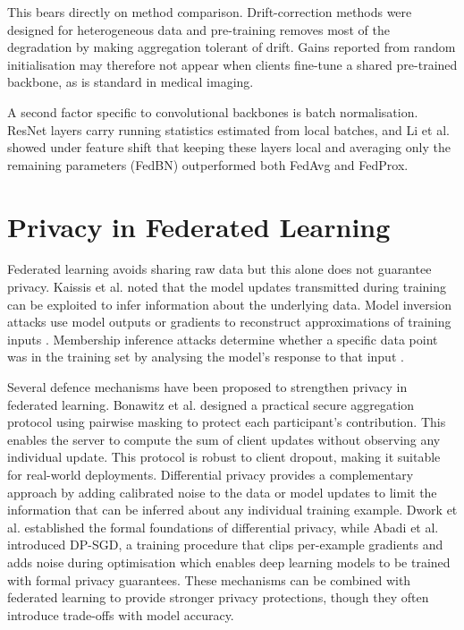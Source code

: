\documentclass[12pt,openany,a4paper]{book}
\begin{document}
This bears directly on method comparison. Drift-correction methods were designed for heterogeneous data and pre-training removes most of the degradation by making aggregation tolerant of drift. Gains reported from random initialisation may therefore not appear when clients fine-tune a shared pre-trained backbone, as is standard in medical imaging.

A second factor specific to convolutional backbones is batch normalisation. ResNet layers carry running statistics estimated from local batches, and Li et al. \cite{liFedBNFederatedLearning2021} showed under feature shift that keeping these layers local and averaging only the remaining parameters (FedBN) outperformed both FedAvg and FedProx.

\section{Privacy in Federated Learning}
Federated learning avoids sharing raw data but this alone does not guarantee privacy. Kaissis et al. \cite{kaissisSecurePrivacypreservingFederated2020} noted that the model updates transmitted during training can be exploited to infer information about the underlying data. Model inversion attacks use model outputs or gradients to reconstruct approximations of training inputs \cite{fredriksonModelInversionAttacks2015}. Membership inference attacks determine whether a specific data point was in the training set by analysing the model's response to that input \cite{shokriMembershipInferenceAttacks2017}.

Several defence mechanisms have been proposed to strengthen privacy in federated learning. Bonawitz et al. \cite{bonawitzPracticalSecureAggregation2017} designed a practical secure aggregation protocol using pairwise masking to protect each participant's contribution. This enables the server to compute the sum of client updates without observing any individual update. This protocol is robust to client dropout, making it suitable for real-world deployments. Differential privacy provides a complementary approach by adding calibrated noise to the data or model updates to limit the information that can be inferred about any individual training example. Dwork et al. \cite{dworkCalibratingNoiseSensitivity2006} established the formal foundations of differential privacy, while Abadi et al. \cite{abadiDeepLearningDifferential2016} introduced DP-SGD, a training procedure that clips per-example gradients and adds noise during optimisation which enables deep learning models to be trained with formal privacy guarantees. These mechanisms can be combined with federated learning to provide stronger privacy protections, though they often introduce trade-offs with model accuracy.
\end{document}
